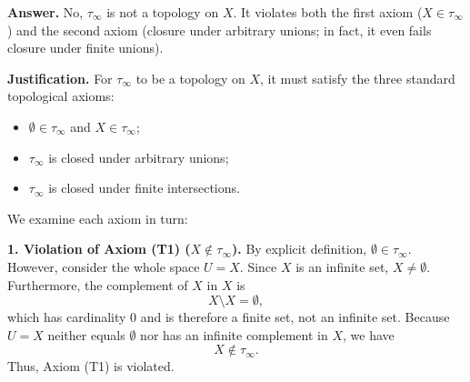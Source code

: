 
\textbf{Answer.} No, $\tau_\infty$ is not a topology on $X$. It violates both the first axiom
($X\in\tau_\infty$) and the second axiom (closure under arbitrary unions; in fact, it even fails
closure under finite unions).

\textbf{Justification.} For $\tau_\infty$ to be a topology on $X$, it must satisfy the three
standard topological axioms:
\begin{itemize}
  \item[(T1)] $\emptyset\in\tau_\infty$ and $X\in\tau_\infty$;
  \item[(T2)] $\tau_\infty$ is closed under arbitrary unions;
  \item[(T3)] $\tau_\infty$ is closed under finite intersections.
\end{itemize}
We examine each axiom in turn:

\textbf{1. Violation of Axiom (T1) ($X\notin\tau_\infty$).} By explicit definition,
$\emptyset\in\tau_\infty$. However, consider the whole space $U=X$. Since $X$ is an infinite
set, $X\neq\emptyset$. Furthermore, the complement of $X$ in $X$ is
\[ X\setminus X=\emptyset, \]
which has cardinality $0$ and is therefore a finite set, not an infinite set. Because $U=X$
neither equals $\emptyset$ nor has an infinite complement in $X$, we have
\[ X\notin\tau_\infty. \]
Thus, Axiom (T1) is violated.

